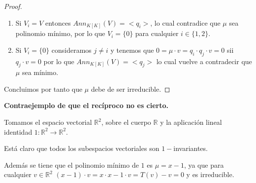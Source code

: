 \documentclass{article}
\newcommand{\R}{\mathbb{R}}
\begin{document}
\begin{proof}
\begin{enumerate}
    \item Si $V_i = V$ entonces $Ann_{K[K]}(V)= <q_i>$, lo cual contradice que $\mu$ sea polinomio mínimo, por lo que 
    $V_i=\{0\}$ para cualquier $i \in \{1, 2\}$. 
    \item Si $V_i=\{0\}$ consideramos $j \neq i$ y tenemos que 
    $0 = \mu \cdot v =  q_i \cdot q_j \cdot v = 0$ sii $q_j \cdot v = 0$ por lo que $Ann_{K[K]}(V)= <q_j>$ lo cual vuelve a contradecir que $\mu$ sea mínimo.
\end{enumerate}

Concluimos por tanto que $\mu$ debe de ser irreducible. 
\end{proof}


\textbf{Contraejemplo de que el recíproco no es cierto.}

Tomamos el espacio vectorial $\R^2$, sobre el cuerpo $\R$ y la aplicación lineal identidad $1: \R^2 \longrightarrow \R^2$. 

Está claro que todos los subespacios vectoriales son $1-$invariantes. 

Además se tiene que el polinomio mínimo de $1$ es $\mu = x - 1$, ya que para cualquier $v \in \R^2$ 
$(x-1) \cdot v = x \cdot x - 1 \cdot v = T(v) - v = 0$ y es irreducible.
\end{document}
